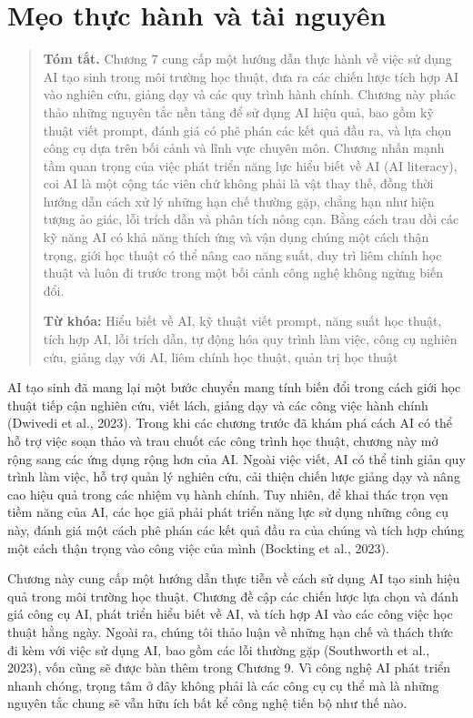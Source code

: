 \chapter{Mẹo thực hành và tài nguyên}

\begin{quote}\small

\textbf{Tóm tắt.} Chương 7 cung cấp một hướng dẫn thực hành về việc sử dụng AI tạo sinh trong môi trường học thuật, đưa ra các chiến lược tích hợp AI vào nghiên cứu, giảng dạy và các quy trình hành chính. Chương này phác thảo những nguyên tắc nền tảng để sử dụng AI hiệu quả, bao gồm kỹ thuật viết prompt, đánh giá có phê phán các kết quả đầu ra, và lựa chọn công cụ dựa trên bối cảnh và lĩnh vực chuyên môn. Chương nhấn mạnh tầm quan trọng của việc phát triển năng lực hiểu biết về AI (AI literacy), coi AI là một cộng tác viên chứ không phải là vật thay thế, đồng thời hướng dẫn cách xử lý những hạn chế thường gặp, chẳng hạn như hiện tượng ảo giác, lỗi trích dẫn và phân tích nông cạn. Bằng cách trau dồi các kỹ năng AI có khả năng thích ứng và vận dụng chúng một cách thận trọng, giới học thuật có thể nâng cao năng suất, duy trì liêm chính học thuật và luôn đi trước trong một bối cảnh công nghệ không ngừng biến đổi.

\textbf{Từ khóa:} Hiểu biết về AI, kỹ thuật viết prompt, năng suất học thuật, tích hợp AI, lỗi trích dẫn, tự động hóa quy trình làm việc, công cụ nghiên cứu, giảng dạy với AI, liêm chính học thuật, quản trị học thuật

\end{quote}

AI tạo sinh đã mang lại một bước chuyển mang tính biến đổi trong cách giới học thuật tiếp cận nghiên cứu, viết lách, giảng dạy và các công việc hành chính (Dwivedi et al., 2023). Trong khi các chương trước đã khám phá cách AI có thể hỗ trợ việc soạn thảo và trau chuốt các công trình học thuật, chương này mở rộng sang các ứng dụng rộng hơn của AI. Ngoài việc viết, AI có thể tinh giản quy trình làm việc, hỗ trợ quản lý nghiên cứu, cải thiện chiến lược giảng dạy và nâng cao hiệu quả trong các nhiệm vụ hành chính. Tuy nhiên, để khai thác trọn vẹn tiềm năng của AI, các học giả phải phát triển năng lực sử dụng những công cụ này, đánh giá một cách phê phán các kết quả đầu ra của chúng và tích hợp chúng một cách thận trọng vào công việc của mình (Bockting et al., 2023).

Chương này cung cấp một hướng dẫn thực tiễn về cách sử dụng AI tạo sinh hiệu quả trong môi trường học thuật. Chương đề cập các chiến lược lựa chọn và đánh giá công cụ AI, phát triển hiểu biết về AI, và tích hợp AI vào các công việc học thuật hằng ngày. Ngoài ra, chúng tôi thảo luận về những hạn chế và thách thức đi kèm với việc sử dụng AI, bao gồm các lỗi thường gặp (Southworth et al., 2023), vốn cũng sẽ được bàn thêm trong Chương 9. Vì công nghệ AI phát triển nhanh chóng, trọng tâm ở đây không phải là các công cụ cụ thể mà là những nguyên tắc chung sẽ vẫn hữu ích bất kể công nghệ tiến bộ như thế nào.

